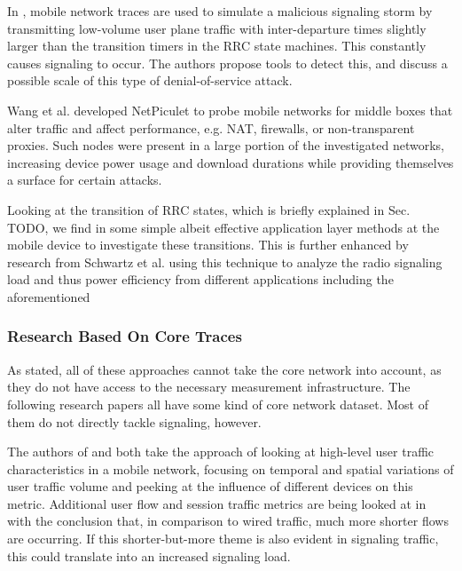 In \cite{lee2007detection}, mobile network traces are used to simulate a malicious signaling storm by transmitting low-volume user plane traffic with inter-departure times slightly larger than the transition timers in the \gls{RRC} state machines. This constantly causes signaling to occur. The authors propose tools to detect this, and discuss a possible scale of this type of denial-of-service attack.

 
Wang et al.\cite{wang2011untold} developed NetPiculet to probe mobile networks for middle boxes that alter traffic and affect performance, e.g. NAT, firewalls, or non-transparent proxies. Such nodes were present in a large portion of the investigated networks, increasing device power usage and download durations while providing themselves a surface for certain attacks.

Looking at the transition of \gls{RRC} states, which is briefly explained in Sec. TODO, we find in \cite{5360763} some simple albeit effective application layer methods at the mobile device to investigate these transitions. This is further enhanced by research from Schwartz et al.\cite{schwartz2013angrybirds} using this technique to analyze the radio signaling load and thus power efficiency from different applications including the aforementioned


\subsubsection{Research Based On Core Traces}

As stated, all of these approaches cannot take the core network into account, as they do not have access to the necessary measurement infrastructure. The following research papers all have some kind of core network dataset. Most of them do not directly tackle signaling, however.

The authors of \cite{shafiq2011characterizing} and \cite{paul2011understanding} both take the approach of looking at high-level user traffic characteristics in a mobile network, focusing on temporal and spatial variations of user traffic volume and peeking at the influence of different devices on this metric. Additional user flow and session traffic metrics are being looked at in \cite{Zhang:2012:UCC:2377677.2377764} with the conclusion that, in comparison to wired traffic, much more shorter flows are occurring. If this shorter-but-more theme is also evident in signaling traffic, this could translate into an increased signaling load.

